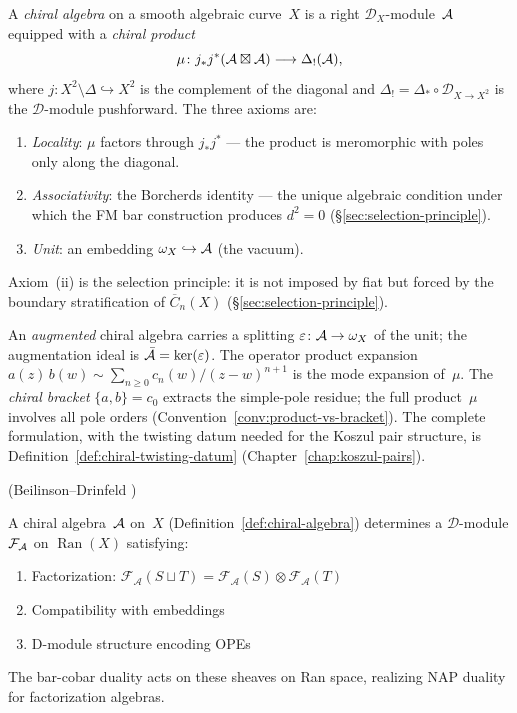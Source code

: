 \begin{definition}\label{def:chiral-algebra}
A \emph{chiral algebra} on a smooth algebraic curve~$X$ is a
right $\mathcal{D}_X$-module~$\mathcal{A}$ equipped with a
\emph{chiral product}
\[
\mu \colon j_* j^*(\mathcal{A} \boxtimes \mathcal{A}) \longrightarrow
\Delta_!(\mathcal{A}),
\]
where $j \colon X^2 \setminus \Delta \hookrightarrow X^2$ is the
complement of the diagonal and
$\Delta_! = \Delta_* \circ \mathcal{D}_{X \to X^2}$ is the
$\mathcal{D}$-module pushforward.  The three axioms are:
\begin{enumerate}[label=\textup{(\roman*)}]
\item \emph{Locality}: $\mu$ factors through $j_* j^*$
  --- the product is meromorphic with poles only along the
  diagonal.
\item \emph{Associativity}: the Borcherds identity
  --- the unique algebraic condition under which the FM bar
  construction produces $d^2 = 0$
  (\S\ref{sec:selection-principle}).
\item \emph{Unit}: an embedding
  $\omega_X \hookrightarrow \mathcal{A}$ (the vacuum).
\end{enumerate}
Axiom~(ii) is the selection principle: it is not imposed by fiat
but forced by the boundary stratification of
$\overline{C}_n(X)$ (\S\ref{sec:selection-principle}).

An \emph{augmented} chiral algebra carries a splitting
$\varepsilon \colon \mathcal{A} \to \omega_X$ of the unit; the
augmentation ideal is
$\bar{\mathcal{A}} = \ker(\varepsilon)$.
The operator product expansion
$a(z)\,b(w) \sim \sum_{n \geq 0} c_n(w)/(z-w)^{n+1}$
is the mode expansion of~$\mu$.  The \emph{chiral bracket}
$\{a, b\} = c_0$ extracts the simple-pole residue; the full
product~$\mu$ involves all pole orders
(Convention~\ref{conv:product-vs-bracket}).
The complete formulation, with the twisting datum
needed for the Koszul pair structure, is
Definition~\ref{def:chiral-twisting-datum}
(Chapter~\ref{chap:koszul-pairs}).
\end{definition}

\begin{theorem}\label{thm:chiral-ran}
\textup{(Beilinson--Drinfeld \cite[Chapter~3]{BD04})}

A chiral algebra~$\mathcal{A}$ on~$X$
(Definition~\ref{def:chiral-algebra}) determines a
$\mathcal{D}$-module $\mathcal{F}_{\mathcal{A}}$ on
$\operatorname{Ran}(X)$ satisfying:
\begin{enumerate}
\item Factorization: $\mathcal{F}_{\mathcal{A}}(S \sqcup T) = \mathcal{F}_{\mathcal{A}}(S) \otimes \mathcal{F}_{\mathcal{A}}(T)$
\item Compatibility with embeddings
\item D-module structure encoding OPEs
\end{enumerate}

The bar-cobar duality acts on these sheaves on Ran space, realizing NAP duality for factorization algebras.
\end{theorem}


